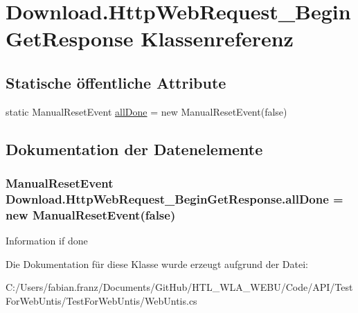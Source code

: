 \hypertarget{class_download_1_1_http_web_request___begin_get_response}{\section{Download.\-Http\-Web\-Request\-\_\-\-Begin\-Get\-Response Klassenreferenz}
\label{class_download_1_1_http_web_request___begin_get_response}
}
\subsection*{Statische öffentliche Attribute}
\begin{DoxyCompactItemize}
\item 
static Manual\-Reset\-Event \hyperlink{class_download_1_1_http_web_request___begin_get_response_abf8ceb91508e305aa886e05eaed3737e}{all\-Done} = new Manual\-Reset\-Event(false)
\end{DoxyCompactItemize}


\subsection{Dokumentation der Datenelemente}
\hypertarget{class_download_1_1_http_web_request___begin_get_response_abf8ceb91508e305aa886e05eaed3737e}{
\subsubsection[{all\-Done}]{\setlength{\rightskip}{0pt plus 5cm}Manual\-Reset\-Event Download.\-Http\-Web\-Request\-\_\-\-Begin\-Get\-Response.\-all\-Done = new Manual\-Reset\-Event(false)\hspace{0.3cm}{\ttfamily [static]}}}\label{class_download_1_1_http_web_request___begin_get_response_abf8ceb91508e305aa886e05eaed3737e}
Information if done 

Die Dokumentation für diese Klasse wurde erzeugt aufgrund der Datei\-:\begin{DoxyCompactItemize}
\item 
C\-:/\-Users/fabian.\-franz/\-Documents/\-Git\-Hub/\-H\-T\-L\-\_\-\-W\-L\-A\-\_\-\-W\-E\-B\-U/\-Code/\-A\-P\-I/\-Test\-For\-Web\-Untis/\-Test\-For\-Web\-Untis/Web\-Untis.\-cs\end{DoxyCompactItemize}
